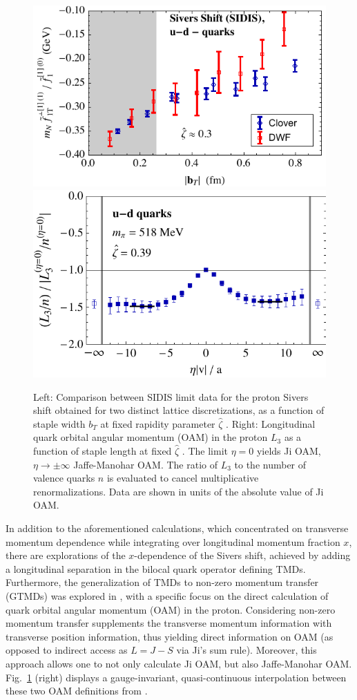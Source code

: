 \begin{figure}[h!]
	\centering
	\includegraphics[width=0.462\columnwidth]{figures/UminusD_SiversRat_zetahat-0p35_bdepend_comb}\hspace{1cm}
	\includegraphics[width=0.45\columnwidth]{figures/etaplot_umd_zeta39}
	\caption{Left: Comparison between SIDIS limit data for the proton Sivers
		shift obtained for two distinct lattice discretizations, as a function of
		staple width $b_T $ at fixed rapidity parameter $\hat{\zeta } $
		\cite{Yoon:2017qzo}. Right: Longitudinal quark orbital angular momentum
		(OAM) in the proton $L_3 $ as a function of staple length at fixed
		$\hat{\zeta } $ \cite{Engelhardt:2017miy}. The limit $\eta =0$ yields Ji
		OAM, $\eta \rightarrow \pm \infty $ Jaffe-Manohar OAM. The ratio of $L_3 $
		to the number of valence quarks $n$ is evaluated to cancel multiplicative
		renormalizations. Data are shown in units of the absolute value of Ji OAM.}
	\label{tmd_comp}
\end{figure}


In addition to the aforementioned calculations, which concentrated on
transverse momentum dependence while integrating over longitudinal
momentum fraction $x$, there are explorations of the
$x$-dependence of the Sivers shift, achieved by adding a
longitudinal separation in the bilocal quark operator defining TMDs.
Furthermore, the generalization
of TMDs to non-zero momentum transfer (GTMDs) was explored in
\cite{Engelhardt:2017miy}, with a specific focus on the direct
calculation of quark orbital angular momentum (OAM) in the proton.
Considering non-zero momentum transfer supplements the transverse
momentum information with transverse position information, thus
yielding direct information on OAM (as opposed to indirect access
as $L=J-S$ via Ji's sum rule). Moreover, this approach allows one
to not only calculate Ji OAM, but also Jaffe-Manohar OAM.
Fig.~\ref{tmd_comp} (right) displays a gauge-invariant, quasi-continuous
interpolation between these two OAM definitions from \cite{Engelhardt:2017miy}.

